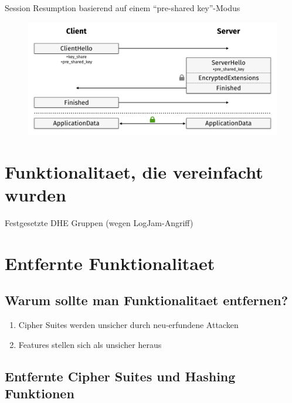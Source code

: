 \documentclass{f4_beamer_metropolis}
\begin{document}
\begin{frame}{Session Resumption basierend auf einem \enquote{pre-shared key}-Modus}
  \begin{figure}[!h]
    \centering
    \includegraphics[width=\linewidth]{./images/tls13-handshake-resumption.png}
    \label{fig:tls13-handshake-resumption}
  \end{figure}
\end{frame}

\section{Funktionalitaet, die vereinfacht wurden}

\begin{frame}{}
Festgesetzte DHE Gruppen (wegen LogJam-Angriff)
\end{frame}

\section{Entfernte Funktionalitaet}

\subsection{Warum sollte man Funktionalitaet entfernen?}

\begin{frame}
  \begin{enumerate}[<+->]
    \item Cipher Suites werden unsicher durch neu-erfundene Attacken
    \item Features stellen sich als unsicher heraus
    \end{enumerate}
\end{frame}

\subsection{Entfernte Cipher Suites und Hashing Funktionen}
\end{document}
